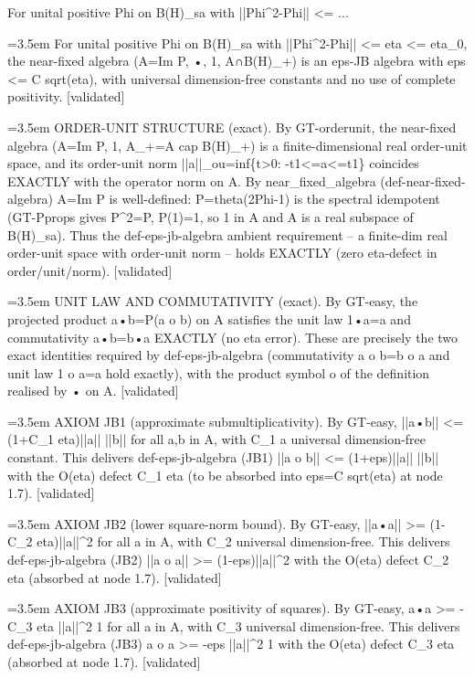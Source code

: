 \documentclass{article}
\newcommand{\step}[1]{\par\noindent\hangindent=3.5em\hangafter=1%
  \makebox[3.5em][l]{\textbf{#1.}}}
\newcommand{\steptag}[1]{\hfill{\small\textsf{[#1]}}}
\begin{document}
\begin{proofbox}{For unital positive Phi on B(H)\_sa with ||Phi\textasciicircum{}2-Phi|| <= ...}
\step{1} For unital positive Phi on B(H)\_sa with ||Phi\textasciicircum{}2-Phi|| <= eta <= eta\_0, the near-fixed algebra (A=Im P, •, 1, A∩B(H)\_+) is an eps-JB algebra with eps <= C sqrt(eta), with universal dimension-free constants and no use of complete positivity. \steptag{validated} \\[6pt]
\step{1.1} ORDER-UNIT STRUCTURE (exact). By GT-orderunit, the near-fixed algebra (A=Im P, 1, A\_+=A cap B(H)\_+) is a finite-dimensional real order-unit space, and its order-unit norm ||a||\_ou=inf\{t>0: -t1<=a<=t1\} coincides EXACTLY with the operator norm on A. By near\_fixed\_algebra (def-near-fixed-algebra) A=Im P is well-defined: P=theta(2Phi-1) is the spectral idempotent (GT-Pprops gives P\textasciicircum{}2=P, P(1)=1, so 1 in A and A is a real subspace of B(H)\_sa). Thus the def-eps-jb-algebra ambient requirement -- a finite-dim real order-unit space with order-unit norm -- holds EXACTLY (zero eta-defect in order/unit/norm). \steptag{validated} \\[4pt]
\step{1.2} UNIT LAW AND COMMUTATIVITY (exact). By GT-easy, the projected product a•b=P(a o b) on A satisfies the unit law 1•a=a and commutativity a•b=b•a EXACTLY (no eta error). These are precisely the two exact identities required by def-eps-jb-algebra (commutativity a o b=b o a and unit law 1 o a=a hold exactly), with the product symbol o of the definition realised by • on A. \steptag{validated} \\[4pt]
\step{1.3} AXIOM JB1 (approximate submultiplicativity). By GT-easy, ||a•b|| <= (1+C\_1 eta)||a|| ||b|| for all a,b in A, with C\_1 a universal dimension-free constant. This delivers def-eps-jb-algebra (JB1) ||a o b|| <= (1+eps)||a|| ||b|| with the O(eta) defect C\_1 eta (to be absorbed into eps=C sqrt(eta) at node 1.7). \steptag{validated} \\[4pt]
\step{1.4} AXIOM JB2 (lower square-norm bound). By GT-easy, ||a•a|| >= (1-C\_2 eta)||a||\textasciicircum{}2 for all a in A, with C\_2 universal dimension-free. This delivers def-eps-jb-algebra (JB2) ||a o a|| >= (1-eps)||a||\textasciicircum{}2 with the O(eta) defect C\_2 eta (absorbed at node 1.7). \steptag{validated} \\[4pt]
\step{1.5} AXIOM JB3 (approximate positivity of squares). By GT-easy, a•a >= -C\_3 eta ||a||\textasciicircum{}2 1 for all a in A, with C\_3 universal dimension-free. This delivers def-eps-jb-algebra (JB3) a o a >= -eps ||a||\textasciicircum{}2 1 with the O(eta) defect C\_3 eta (absorbed at node 1.7). \steptag{validated} \\[4pt]

\end{proofbox}
\end{document}
